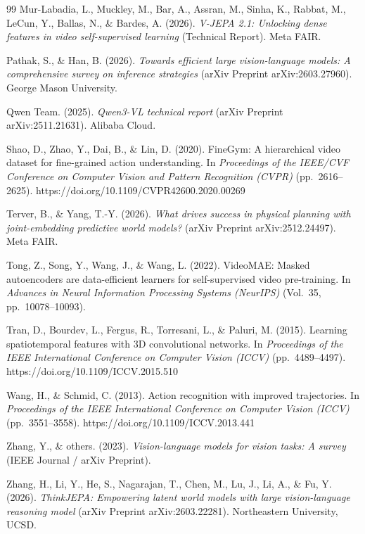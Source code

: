 \begin{thebibliography}{99}
Mur-Labadia, L., Muckley, M., Bar, A., Assran, M., Sinha, K., Rabbat, M., LeCun, Y., Ballas, N., \& Bardes, A. (2026). \textit{V-JEPA 2.1: Unlocking dense features in video self-supervised learning} (Technical Report). Meta FAIR.

Pathak, S., \& Han, B. (2026). \textit{Towards efficient large vision-language models: A comprehensive survey on inference strategies} (arXiv Preprint arXiv:2603.27960). George Mason University.

Qwen Team. (2025). \textit{Qwen3-VL technical report} (arXiv Preprint arXiv:2511.21631). Alibaba Cloud.

Shao, D., Zhao, Y., Dai, B., \& Lin, D. (2020). FineGym: A hierarchical video dataset for fine-grained action understanding. In \textit{Proceedings of the IEEE/CVF Conference on Computer Vision and Pattern Recognition (CVPR)} (pp.~2616--2625). https://doi.org/10.1109/CVPR42600.2020.00269

Terver, B., \& Yang, T.-Y. (2026). \textit{What drives success in physical planning with joint-embedding predictive world models?} (arXiv Preprint arXiv:2512.24497). Meta FAIR.

Tong, Z., Song, Y., Wang, J., \& Wang, L. (2022). VideoMAE: Masked autoencoders are data-efficient learners for self-supervised video pre-training. In \textit{Advances in Neural Information Processing Systems (NeurIPS)} (Vol.~35, pp.~10078--10093).

Tran, D., Bourdev, L., Fergus, R., Torresani, L., \& Paluri, M. (2015). Learning spatiotemporal features with 3D convolutional networks. In \textit{Proceedings of the IEEE International Conference on Computer Vision (ICCV)} (pp.~4489--4497). https://doi.org/10.1109/ICCV.2015.510

Wang, H., \& Schmid, C. (2013). Action recognition with improved trajectories. In \textit{Proceedings of the IEEE International Conference on Computer Vision (ICCV)} (pp.~3551--3558). https://doi.org/10.1109/ICCV.2013.441

Zhang, Y., \& others. (2023). \textit{Vision-language models for vision tasks: A survey} (IEEE Journal / arXiv Preprint).

Zhang, H., Li, Y., He, S., Nagarajan, T., Chen, M., Lu, J., Li, A., \& Fu, Y. (2026). \textit{ThinkJEPA: Empowering latent world models with large vision-language reasoning model} (arXiv Preprint arXiv:2603.22281). Northeastern University, UCSD.

\end{thebibliography}

